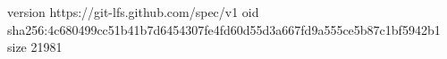version https://git-lfs.github.com/spec/v1
oid sha256:4c680499cc51b41b7d6454307fe4fd60d55d3a667fd9a555ce5b87c1bf5942b1
size 21981
